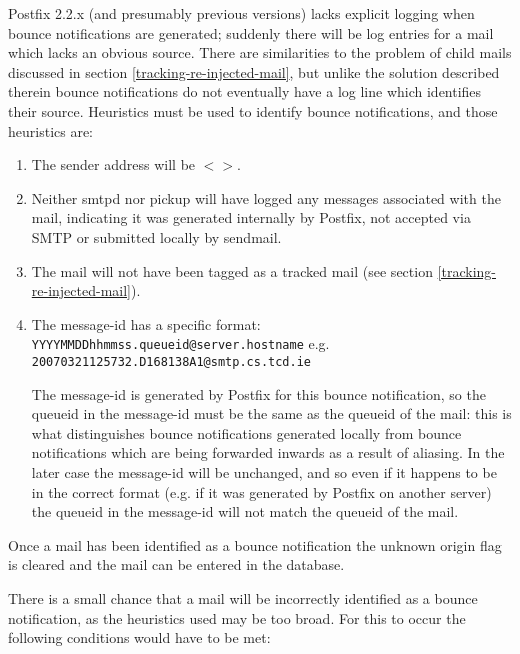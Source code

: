 \documentclass[a4paper,12pt,draft]{article}
\begin{document}
Postfix 2.2.x (and presumably previous versions) lacks explicit logging
when bounce notifications are generated; suddenly there will be log entries
for a mail which lacks an obvious source.  There are similarities to the
problem of child mails discussed in section
\ref{tracking-re-injected-mail}, but unlike the solution described therein
bounce notifications do not eventually have a log line which identifies
their source.  Heuristics must be used to identify bounce notifications,
and those heuristics are:

\begin{enumerate}

    \item The sender address will be $<>$.

    \item Neither smtpd nor pickup will have logged any messages associated
        with the mail, indicating it was generated internally by Postfix,
        not accepted via SMTP or submitted locally by sendmail.

    \item The mail will not have been tagged as a tracked mail (see section
        \ref{tracking-re-injected-mail}).

    \item The message-id has a specific format: \newline
        \texttt{YYYYMMDDhhmmss.queueid@server.hostname} \newline
        e.g. \texttt{20070321125732.D168138A1@smtp.cs.tcd.ie}

        The message-id is generated by Postfix for this bounce
        notification, so the queueid in the message-id must be the same as
        the queueid of the mail: this is what distinguishes bounce
        notifications generated locally from bounce notifications which are
        being forwarded inwards as a result of aliasing.  In the later case
        the message-id will be unchanged, and so even if it happens to be
        in the correct format (e.g. if it was generated by Postfix on
        another server) the queueid in the message-id will not match the
        queueid of the mail.

\end{enumerate}

Once a mail has been identified as a bounce notification the unknown origin
flag is cleared and the mail can be entered in the database.

There is a small chance that a mail will be incorrectly identified as a
bounce notification, as the heuristics used may be too broad.  For this to
occur the following conditions would have to be met:
\end{document}
